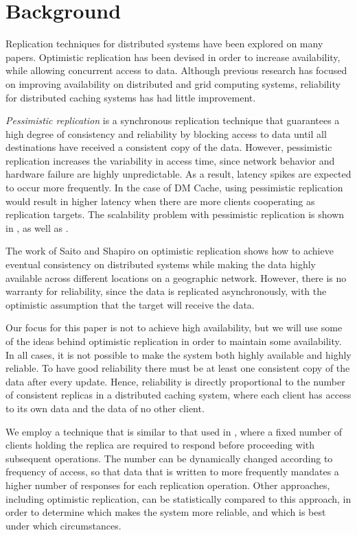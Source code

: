 \section{Background}

Replication techniques for distributed systems have been
explored on many papers. Optimistic replication has been devised
in order to increase availability, while allowing
concurrent access to data\cite{Replication}. Although
previous research has focused on improving availability on
distributed\cite{globally-distributed} and grid computing
systems\cite{Online-Grid}, reliability for distributed caching
systems has had little improvement.

\textit{Pessimistic replication} is a synchronous replication
technique that guarantees a high degree of consistency and
reliability by blocking access to data until all destinations
have received a consistent copy of the data. However, pessimistic
replication increases the variability in access time, since
network behavior and hardware failure are highly unpredictable.
As a result, latency spikes are expected to occur more frequently.
In the case of DM Cache, using pessimistic replication would
result in higher latency when there are more clients cooperating
as replication targets. The scalability problem with pessimistic
replication is shown in \cite{Replicated-Services}, as well as
\cite{Replication-Cost}.

The work of Saito and Shapiro on 
optimistic replication\cite{Replication} shows how to achieve
eventual consistency on distributed systems while making the
data highly available across different locations on a geographic
network. However, there is no warranty for reliability, since the
data is replicated asynchronously, with the optimistic
assumption that the target will receive the data.

Our focus for this paper is not to achieve high
availability, but we will use some of the ideas behind optimistic
replication in order to maintain some availability. In all cases,
it is not possible to make the system both highly available and
highly reliable. To have good reliability there must be at least one
consistent copy of the data after every update. Hence, reliability
is directly proportional to the number of consistent replicas
in a distributed caching system, where each client has access
to its own data and the data of no other client.

We employ a technique that is similar to
that used in \cite{dynamo}, where a fixed number of clients
holding the replica are required to respond before proceeding with
subsequent operations. The number can be dynamically changed
according to frequency of access, so that data that is written to
more frequently mandates a higher number of responses for each
replication operation. Other approaches, including optimistic
replication, can be statistically compared to this approach, in
order to determine which makes the system more reliable, and which
is best under which circumstances.

